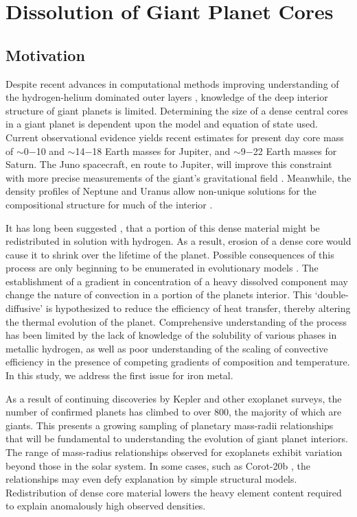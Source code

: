 \chapter{Dissolution of Giant Planet Cores}\label{chap5}

\section{Motivation}

Despite recent advances in computational methods improving understanding of
the hydrogen-helium dominated outer layers
\citep{mcmahon12,french12,militzer13,wilson10}, knowledge of the deep interior structure
of giant planets is limited.
Determining the size of a dense central cores in a giant planet is dependent upon
the model and equation of state used.
Current observational evidence yields recent estimates for present day core
mass of
$\sim$0$-$10 \citep{guillot05} and $\sim$14$-$18 \citep{militzer08} Earth masses for Jupiter, and
$\sim$9$-$22 \citep{guillot05} Earth masses for Saturn.
The Juno spacecraft, en route to Jupiter, will improve this constraint with more 
precise measurements of the giant's gravitational field \citep{helled11}. 
Meanwhile, the density profiles of Neptune and Uranus allow non-unique solutions 
for the compositional structure for much of the interior
\citep{guillot99b,guillot05}.

It has long been suggested
\citep{stevenson82a,stevenson82b}, that a portion of this dense material might be
redistributed in solution with hydrogen. As a result, erosion of a dense core
would cause it to shrink over the lifetime of the planet. Possible consequences of this process
are only beginning to be enumerated in evolutionary models
\citep{chabrier07,leconte12,mirouh12}. The establishment of a gradient in
concentration of a heavy dissolved component may change the nature of
convection in a portion of the planets interior. This `double-diffusive'
is hypothesized to reduce the efficiency of heat transfer, thereby altering
the thermal evolution of the planet. Comprehensive understanding of the
process has been limited by the lack of knowledge of the solubility of various
phases in metallic hydrogen, as well as poor understanding of the scaling of
convective efficiency in the presence of competing gradients of composition
and temperature. In this study, we address the first issue for iron metal.

As a result of continuing discoveries by Kepler \citep{borucki10} and other exoplanet surveys, the
number of confirmed planets has climbed to over 800, the majority of which are
giants. This presents a growing sampling of planetary
mass-radii relationships that will be fundamental to understanding the evolution of
giant planet interiors. The range of mass-radius relationships observed for
exoplanets exhibit variation beyond those in the solar system. In some cases,
such as Corot-20b \citep{deleuil11}, the relationships may even defy explanation by
simple structural models. Redistribution of dense core material lowers the
heavy element content required to explain anomalously high observed densities.

